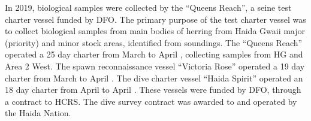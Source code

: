 In 2019, biological samples were collected by the ``Queens Reach'', a seine test charter vessel funded by DFO.
The primary purpose of the test charter vessel was to collect biological samples from main bodies of herring from Haida Gwaii major (priority) and minor stock areas, identiﬁed from soundings.
The ``Queens Reach'' operated a 25 day charter from March  to April , collecting samples from HG and Area 2 West.
The spawn reconnaissance vessel ``Victoria Rose'' operated a 19 day charter from March  to April .
The dive charter vessel ``Haida Spirit'' operated an 18 day charter from April  to April .
These vessels were funded by DFO, through a contract to HCRS.
The dive survey contract was awarded to and operated by the Haida Nation.